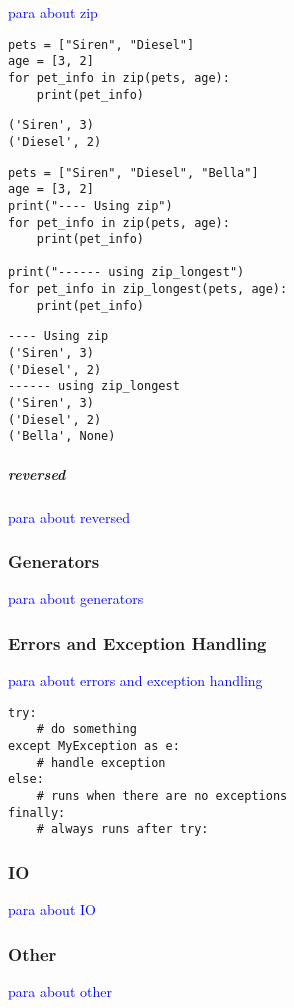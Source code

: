 \textcolor{blue}{para about zip}

\begin{lstlisting}[style=pyInStyle]
pets = ["Siren", "Diesel"]
age = [3, 2]
for pet_info in zip(pets, age):
    print(pet_info)
\end{lstlisting}
\begin{lstlisting}[style=pyOutStyle]
('Siren', 3)
('Diesel', 2)
\end{lstlisting}

\begin{lstlisting}[style=pyInStyle]
pets = ["Siren", "Diesel", "Bella"]
age = [3, 2]
print("---- Using zip")
for pet_info in zip(pets, age):
    print(pet_info)

print("------ using zip_longest")
for pet_info in zip_longest(pets, age):
    print(pet_info)
\end{lstlisting}
\begin{lstlisting}[style=pyOutStyle]
---- Using zip
('Siren', 3)
('Diesel', 2)
------ using zip_longest
('Siren', 3)
('Diesel', 2)
('Bella', None)
\end{lstlisting}

\subparagraph{reversed}

\textcolor{blue}{para about reversed}

\subsubsection{Generators}

\textcolor{blue}{para about generators}

\subsubsection{Errors and Exception Handling}

\textcolor{blue}{para about errors and exception handling}

\begin{lstlisting}[style=pyInStyle]
try:
    # do something
except MyException as e:
    # handle exception
else:
    # runs when there are no exceptions
finally:
    # always runs after try:
\end{lstlisting}

\subsubsection{IO}

\textcolor{blue}{para about IO}

\subsubsection{Other}

\textcolor{blue}{para about other}


